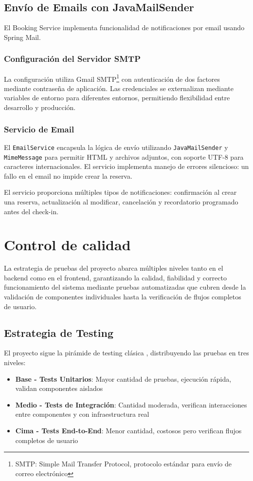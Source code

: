 \subsection{Envío de Emails con JavaMailSender}
El Booking Service implementa funcionalidad de notificaciones por email usando Spring Mail.

\subsubsection{Configuración del Servidor SMTP}
La configuración utiliza Gmail SMTP\footnote{SMTP: Simple Mail Transfer Protocol, protocolo estándar para envío de correo electrónico} con autenticación de dos factores mediante contraseña de aplicación. Las credenciales se externalizan mediante variables de entorno para diferentes entornos, permitiendo flexibilidad entre desarrollo y producción.

\subsubsection{Servicio de Email}
El \texttt{EmailService} encapsula la lógica de envío utilizando \texttt{JavaMailSender} y \texttt{MimeMessage} para permitir HTML y archivos adjuntos, con soporte UTF-8 para caracteres internacionales. El servicio implementa manejo de errores silencioso: un fallo en el email no impide crear la reserva.

El servicio proporciona múltiples tipos de notificaciones: confirmación al crear una reserva, actualización al modificar, cancelación y recordatorio programado antes del check-in.


\section{Control de calidad} 
\label{sec:control_calidad}

La estrategia de pruebas del proyecto abarca múltiples niveles tanto en el backend como en el frontend, garantizando la calidad, fiabilidad y correcto funcionamiento del sistema mediante pruebas automatizadas que cubren desde la validación de componentes individuales hasta la verificación de flujos completos de usuario.

\subsection{Estrategia de Testing}
El proyecto sigue la pirámide de testing clásica \cite{fowler2012}, distribuyendo las pruebas en tres niveles:
\begin{itemize}
\item \textbf{Base - Tests Unitarios}: Mayor cantidad de pruebas, ejecución rápida, validan componentes aislados
\item \textbf{Medio - Tests de Integración}: Cantidad moderada, verifican interacciones entre componentes y con infraestructura real
\item \textbf{Cima - Tests End-to-End}: Menor cantidad, costosos pero verifican flujos completos de usuario
\end{itemize}

